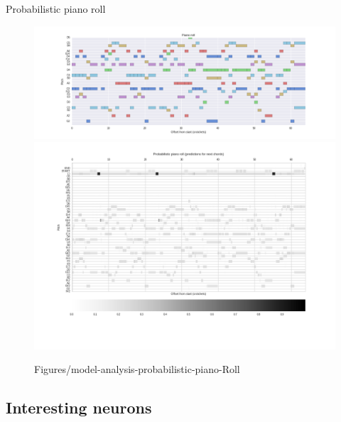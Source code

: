 \documentclass[dissertation.tex]{subfiles}
\begin{document}
Probabilistic piano roll
\begin{figure}[htpb]
    \centering
    \includegraphics[width=1.0\linewidth]{Figures/model-analysis-input-piano-roll.png}
    \includegraphics[trim={0 0 0 1.4cm},clip,width=0.995\linewidth]{Figures/model-analysis-probabilistic-piano-roll.png}
    \caption{Figures/model-analysis-probabilistic-piano-Roll}
    \label{fig:Figures/model-analysis-probabilistic-piano-roll}
\end{figure}

\subsection{Interesting neurons}
\end{document}
